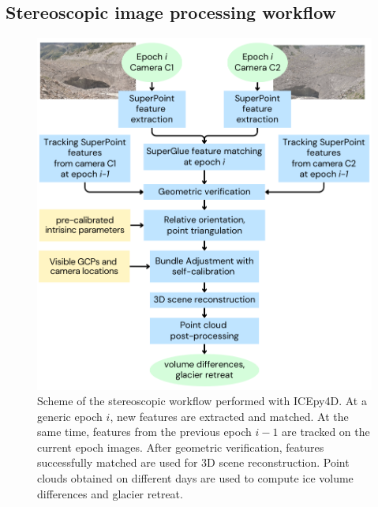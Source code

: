 \subsection{Stereoscopic image processing workflow}\label{sec:stereoworkflow}

\begin{figure}
  \centering
  \includegraphics[width=.5\textwidth]{3_stereo-workflow.png}
  \caption{Scheme of the stereoscopic workflow performed with ICEpy4D. At a generic epoch
    \(i\), new features are extracted and matched.
    At the same time, features from the previous epoch \(i-1\) are tracked on the current
    epoch images. After geometric verification, features successfully
    matched are used for 3D scene reconstruction. Point clouds obtained on
    different days are used to compute ice volume differences and glacier
    retreat.}
  \label{fig:4:stereo-workflow}
\end{figure}

% 
% 
